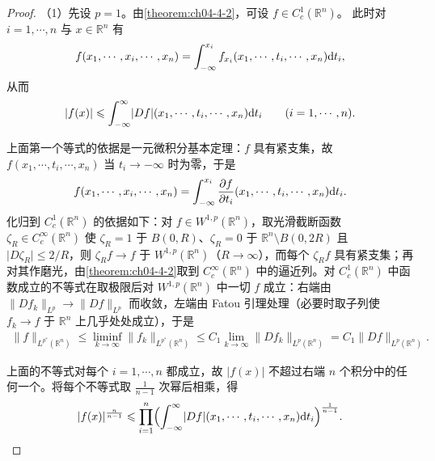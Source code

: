 \documentclass[../../main.tex]{subfiles}%
\begin{document}
\begin{proof}
（1）先设 $p=1$。由\cref{theorem:ch04-4-2}，可设 $f\in C_c^1(\mathbb{R}^n)$。%
此时对 $i=1,\cdots,n$ 与 $x\in\mathbb{R}^n$ 有
\begin{align*}
f(x_1,\cdots,x_i,\cdots,x_n)=\int_{-\infty}^{x_i}f_{x_i}(x_1,\cdots,t_i,\cdots,x_n)\mathrm{d} t_i,
\end{align*}
从而
\begin{align*}
\lvert f(x)\rvert\leqslant\int_{-\infty}^{\infty}\lvert Df\rvert(x_1,\cdots,t_i,\cdots,x_n)\mathrm{d} t_i\qquad(i=1,\cdots,n).
\end{align*}

上面第一个等式的依据是一元微积分基本定理：$f$ 具有紧支集，故 $f(x_1,\cdots,t_i,\cdots,x_n)$ 当 $t_i\to-\infty$ 时为零，于是
\begin{align*}
f(x_1,\cdots,x_i,\cdots,x_n)=\int_{-\infty}^{x_i}\frac{\partial f}{\partial t_i}(x_1,\cdots,t_i,\cdots,x_n)\mathrm{d} t_i .
\end{align*}
化归到 $C_c^1(\mathbb{R}^n)$ 的依据如下：对 $f\in W^{1,p}(\mathbb{R}^n)$，取光滑截断函数 $\zeta_R\in C_c^\infty(\mathbb{R}^n)$ 使 $\zeta_R=1$ 于 $B(0,R)$、$\zeta_R=0$ 于 $\mathbb{R}^n\setminus B(0,2R)$ 且 $\lvert D\zeta_R\rvert\leqslant 2/R$，则 $\zeta_Rf\to f$ 于 $W^{1,p}(\mathbb{R}^n)$（$R\to\infty$），而每个 $\zeta_Rf$ 具有紧支集；再对其作磨光，由\cref{theorem:ch04-4-2}取到 $C_c^\infty(\mathbb{R}^n)$ 中的逼近列。对 $C_c^1(\mathbb{R}^n)$ 中函数成立的不等式在取极限后对 $W^{1,p}(\mathbb{R}^n)$ 中一切 $f$ 成立：右端由 $\lVert Df_k\rVert_{L^{p}}\to\lVert Df\rVert_{L^{p}}$ 而收敛，左端由 Fatou 引理处理（必要时取子列使 $f_k\to f$ 于 $\mathbb{R}^n$ 上几乎处处成立），于是%
\begin{align*}
\lVert f\rVert_{L^{p^*}(\mathbb{R}^n)}\leqslant\liminf_{k\to\infty}\lVert f_k\rVert_{L^{p^*}(\mathbb{R}^n)}\leqslant C_1\lim_{k\to\infty}\lVert Df_k\rVert_{L^{p}(\mathbb{R}^n)}=C_1\lVert Df\rVert_{L^{p}(\mathbb{R}^n)} .
\end{align*}

上面的不等式对每个 $i=1,\cdots,n$ 都成立，故 $\lvert f(x)\rvert$ 不超过右端 $n$ 个积分中的任何一个。将每个不等式取 $\frac{1}{n-1}$ 次幂后相乘，得
\begin{align*}
\lvert f(x)\rvert^{\frac{n}{n-1}}\leqslant\prod_{i=1}^{n}\Bigl(\int_{-\infty}^{\infty}\lvert Df\rvert(x_1,\cdots,t_i,\cdots,x_n)\mathrm{d} t_i\Bigr)^{\frac{1}{n-1}}.
\end{align*}


\end{proof}
\end{document}
